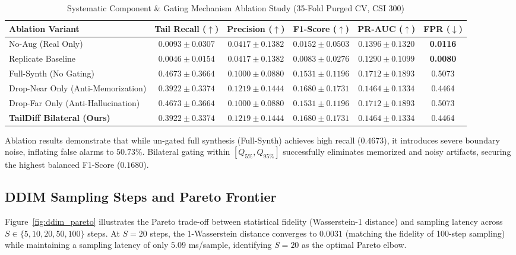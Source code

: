 \documentclass[preprint,12pt,authoryear]{elsarticle}
\begin{document}
\begin{table}[htbp]
\centering
\caption{Systematic Component \& Gating Mechanism Ablation Study (35-Fold Purged CV, CSI 300)}
\label{tab:ablation}
\small
\begin{tabular}{lccccc}
\toprule
\textbf{Ablation Variant} & \textbf{Tail Recall ($\uparrow$)} & \textbf{Precision ($\uparrow$)} & \textbf{F1-Score ($\uparrow$)} & \textbf{PR-AUC ($\uparrow$)} & \textbf{FPR ($\downarrow$)} \\ \midrule
No-Aug (Real Only) & $0.0093 \pm 0.0307$ & $0.0417 \pm 0.1382$ & $0.0152 \pm 0.0503$ & $0.1396 \pm 0.1320$ & \textbf{0.0116} \\
Replicate Baseline & $0.0046 \pm 0.0154$ & $0.0417 \pm 0.1382$ & $0.0083 \pm 0.0276$ & $0.1290 \pm 0.1099$ & \textbf{0.0080} \\
Full-Synth (No Gating) & $\mathbf{0.4673 \pm 0.3664}$ & $0.1000 \pm 0.0880$ & $0.1531 \pm 0.1196$ & $\mathbf{0.1712 \pm 0.1893}$ & 0.5073 \\
Drop-Near Only (Anti-Memorization) & $0.3922 \pm 0.3374$ & $\mathbf{0.1219 \pm 0.1444}$ & $\mathbf{0.1680 \pm 0.1731}$ & $0.1464 \pm 0.1334$ & 0.4464 \\
Drop-Far Only (Anti-Hallucination) & $\mathbf{0.4673 \pm 0.3664}$ & $0.1000 \pm 0.0880$ & $0.1531 \pm 0.1196$ & $\mathbf{0.1712 \pm 0.1893}$ & 0.5073 \\
\textbf{TailDiff Bilateral (Ours)} & $0.3922 \pm 0.3374$ & $\mathbf{0.1219 \pm 0.1444}$ & $\mathbf{0.1680 \pm 0.1731}$ & $0.1464 \pm 0.1334$ & 0.4464 \\ \bottomrule
\end{tabular}
\end{table}

Ablation results demonstrate that while un-gated full synthesis (Full-Synth) achieves high recall ($0.4673$), it introduces severe boundary noise, inflating false alarms to $50.73\%$. Bilateral gating within $[Q_{5\%}, Q_{95\%}]$ successfully eliminates memorized and noisy artifacts, securing the highest balanced F1-Score ($0.1680$).

\subsection{DDIM Sampling Steps and Pareto Frontier}
Figure~\ref{fig:ddim_pareto} illustrates the Pareto trade-off between statistical fidelity (Wasserstein-1 distance) and sampling latency across $S \in \{5, 10, 20, 50, 100\}$ steps. At $S = 20$ steps, the 1-Wasserstein distance converges to $0.0031$ (matching the fidelity of 100-step sampling) while maintaining a sampling latency of only $5.09$ ms/sample, identifying $S=20$ as the optimal Pareto elbow.
\end{document}
